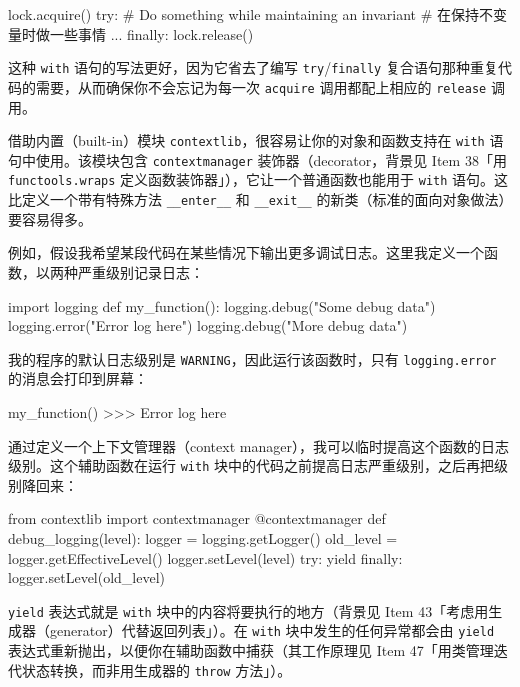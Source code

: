 \begin{codebox}[python]
lock.acquire()
try:
    # Do something while maintaining an invariant
    # 在保持不变量时做一些事情
    ...
finally:
    lock.release()
\end{codebox}

这种 \texttt{with} 语句的写法更好，因为它省去了编写 \texttt{try}/\texttt{finally} 复合语句那种重复代码的需要，从而确保你不会忘记为每一次 \texttt{acquire} 调用都配上相应的 \texttt{release} 调用。

借助内置（built-in）模块 \texttt{contextlib}，很容易让你的对象和函数支持在 \texttt{with} 语句中使用。该模块包含 \texttt{contextmanager} 装饰器（decorator，背景见 Item 38「用 \texttt{functools.wraps} 定义函数装饰器」），它让一个普通函数也能用于 \texttt{with} 语句。这比定义一个带有特殊方法 \texttt{\_\_enter\_\_} 和 \texttt{\_\_exit\_\_} 的新类（标准的面向对象做法）要容易得多。

例如，假设我希望某段代码在某些情况下输出更多调试日志。这里我定义一个函数，以两种严重级别记录日志：

\begin{codebox}[python]
import logging
def my_function():
    logging.debug("Some debug data")
    logging.error("Error log here")
    logging.debug("More debug data")
\end{codebox}

我的程序的默认日志级别是 \texttt{WARNING}，因此运行该函数时，只有 \texttt{logging.error} 的消息会打印到屏幕：

\begin{codebox}[python]
my_function()
>>>
Error log here
\end{codebox}

通过定义一个上下文管理器（context manager），我可以临时提高这个函数的日志级别。这个辅助函数在运行 \texttt{with} 块中的代码之前提高日志严重级别，之后再把级别降回来：

\begin{codebox}[python]
from contextlib import contextmanager
@contextmanager
def debug_logging(level):
    logger = logging.getLogger()
    old_level = logger.getEffectiveLevel()
    logger.setLevel(level)
    try:
        yield
    finally:
        logger.setLevel(old_level)
\end{codebox}

\texttt{yield} 表达式就是 \texttt{with} 块中的内容将要执行的地方（背景见 Item 43「考虑用生成器（generator）代替返回列表」）。在 \texttt{with} 块中发生的任何异常都会由 \texttt{yield} 表达式重新抛出，以便你在辅助函数中捕获（其工作原理见 Item 47「用类管理迭代状态转换，而非用生成器的 \texttt{throw} 方法」）。

